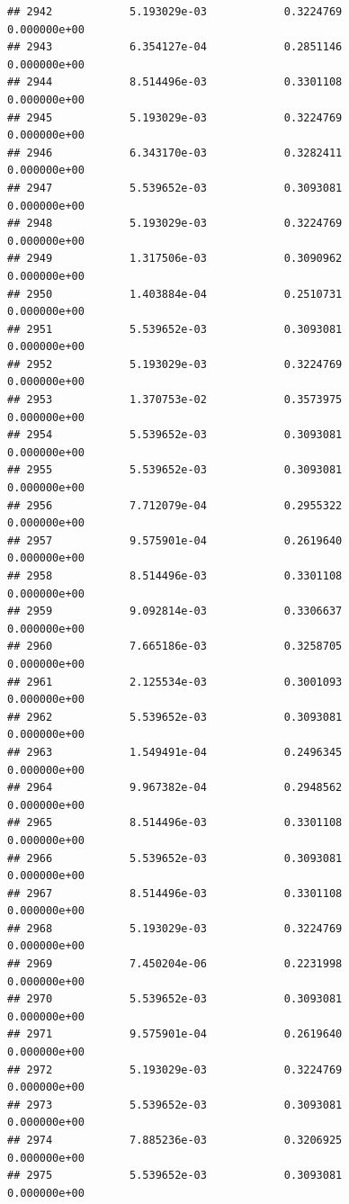 \documentclass[
]{article}
\begin{document}
\begin{verbatim}
## 2942            5.193029e-03            0.3224769            0.000000e+00
## 2943            6.354127e-04            0.2851146            0.000000e+00
## 2944            8.514496e-03            0.3301108            0.000000e+00
## 2945            5.193029e-03            0.3224769            0.000000e+00
## 2946            6.343170e-03            0.3282411            0.000000e+00
## 2947            5.539652e-03            0.3093081            0.000000e+00
## 2948            5.193029e-03            0.3224769            0.000000e+00
## 2949            1.317506e-03            0.3090962            0.000000e+00
## 2950            1.403884e-04            0.2510731            0.000000e+00
## 2951            5.539652e-03            0.3093081            0.000000e+00
## 2952            5.193029e-03            0.3224769            0.000000e+00
## 2953            1.370753e-02            0.3573975            0.000000e+00
## 2954            5.539652e-03            0.3093081            0.000000e+00
## 2955            5.539652e-03            0.3093081            0.000000e+00
## 2956            7.712079e-04            0.2955322            0.000000e+00
## 2957            9.575901e-04            0.2619640            0.000000e+00
## 2958            8.514496e-03            0.3301108            0.000000e+00
## 2959            9.092814e-03            0.3306637            0.000000e+00
## 2960            7.665186e-03            0.3258705            0.000000e+00
## 2961            2.125534e-03            0.3001093            0.000000e+00
## 2962            5.539652e-03            0.3093081            0.000000e+00
## 2963            1.549491e-04            0.2496345            0.000000e+00
## 2964            9.967382e-04            0.2948562            0.000000e+00
## 2965            8.514496e-03            0.3301108            0.000000e+00
## 2966            5.539652e-03            0.3093081            0.000000e+00
## 2967            8.514496e-03            0.3301108            0.000000e+00
## 2968            5.193029e-03            0.3224769            0.000000e+00
## 2969            7.450204e-06            0.2231998            0.000000e+00
## 2970            5.539652e-03            0.3093081            0.000000e+00
## 2971            9.575901e-04            0.2619640            0.000000e+00
## 2972            5.193029e-03            0.3224769            0.000000e+00
## 2973            5.539652e-03            0.3093081            0.000000e+00
## 2974            7.885236e-03            0.3206925            0.000000e+00
## 2975            5.539652e-03            0.3093081            0.000000e+00

\end{verbatim}
\end{document}
